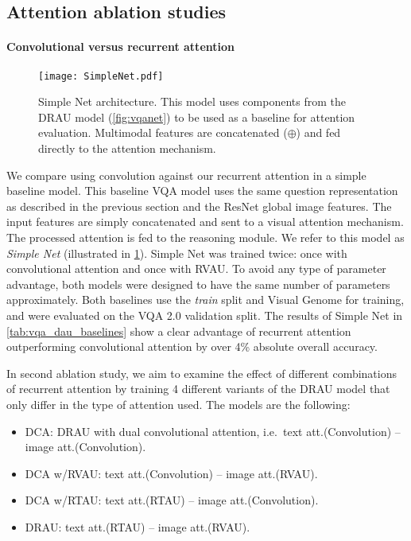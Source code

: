 \documentclass[times,twocolumn, final ,authoryear]{elsarticle}
\begin{document}
\subsection{Attention ablation studies}

\paragraph{Convolutional versus recurrent attention}


\begin{figure}
	\centering
	\texttt{[image: SimpleNet.pdf]}
	\caption{Simple Net architecture. This model uses components from the DRAU model (\cref{fig:vqanet}) to be used as a baseline for attention evaluation. Multimodal features are concatenated ($\oplus$) and fed directly to the attention mechanism.}
	\label{fig:simplenet]}
\end{figure}



We compare using convolution against our recurrent attention in a simple baseline model. 
This baseline VQA model uses the same question representation as described in the previous section and the ResNet global image features. The input features are simply concatenated and sent to a visual attention mechanism. The processed attention is fed to the reasoning module. We refer to this model as \textit{Simple Net} (illustrated in \cref{fig:simplenet]}). Simple Net was trained twice: once with convolutional attention and once with \ac{RVAU}. To avoid any type of parameter advantage, both models were designed to have the same number of parameters approximately. Both baselines use the \textit{train} split and Visual Genome \citep{krishna2017} for training, and were evaluated on the VQA 2.0 validation split. The results of Simple Net in \cref{tab:vqa_dau_baselines} show a clear advantage of recurrent attention outperforming convolutional attention by over 4\% absolute overall accuracy.

In second ablation study, we aim to examine the effect of different combinations of recurrent attention by training 4 different variants of the \ac{DRAU} model that only differ in the type of attention used. The models are the following: 
	\begin{itemize}
		\item \ac{DCA}: DRAU with dual convolutional attention, i.e.\ text att.(Convolution) -- image att.(Convolution).
		\item \ac{DCA} w/\ac{RVAU}: text att.(Convolution) -- image att.(\ac{RVAU}).
		\item \ac{DCA} w/\ac{RTAU}: text att.(\ac{RTAU}) -- image att.(Convolution).
		\item DRAU: text att.(\ac{RTAU}) -- image att.(\ac{RVAU}).
	\end{itemize}
\end{document}
